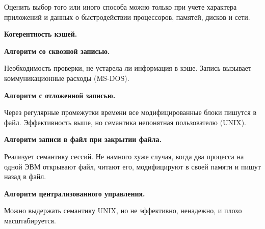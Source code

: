 Оценить выбор того или иного способа можно только при учете характера приложений и данных о быстродействии процессоров, памятей, дисков и сети.

\textbf{Когерентность кэшей.} 

\textbf{Алгоритм со сквозной записью.}

Необходимость проверки, не устарела ли информация в кэше. 
Запись вызывает коммуникационные расходы (MS-DOS).

\textbf{Алгоритм с отложенной записью.} 

Через регулярные промежутки времени все модифицированные блоки пишутся в файл.
Эффективность выше, но семантика непонятная пользователю (UNIX).

\textbf{Алгоритм записи в файл при закрытии файла.} 

Реализует семантику сессий. 
Не намного хуже случая, когда два процесса на одной ЭВМ открывают файл, читают
его, модифицируют в своей памяти и пишут назад в файл. 

\textbf{Алгоритм централизованного управления.}

Можно выдержать семантику UNIX, но не эффективно, ненадежно, и плохо масштабируется.

